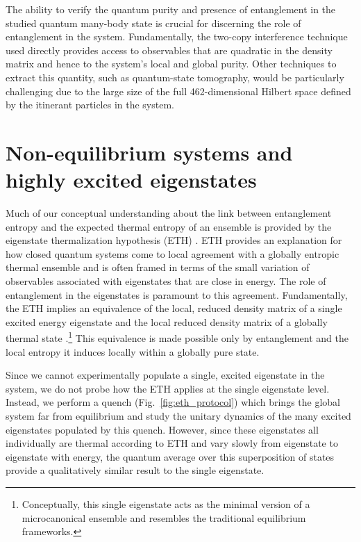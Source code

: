 The ability to verify the quantum purity and presence of entanglement in the studied quantum many-body state is crucial for discerning the role of entanglement in the system. Fundamentally, the two-copy interference technique used directly provides access to observables that are quadratic in the density matrix and hence to the system's local and global purity\cite{Islam2015}. Other techniques to extract this quantity, such as quantum-state tomography, would be particularly challenging due to the large size of the full 462-dimensional Hilbert space defined by the itinerant particles in the system. 

\section{Non-equilibrium systems and highly excited eigenstates}
\label{sec:ensPredict}

Much of our conceptual understanding about the link between entanglement entropy and the expected thermal entropy of an ensemble\cite{Santos2012,Deutsch2013} is provided by the eigenstate thermalization hypothesis (ETH) \cite{Deutsch1991,Rigol2008,Jensen1985,Srednicki1994}. ETH provides an explanation for how closed quantum systems come to local agreement with a globally entropic thermal ensemble and is often framed in terms of the small variation of observables associated with eigenstates that are close in energy\cite{Deutsch1991,Rigol2008,Srednicki1994}. The role of entanglement in the eigenstates is paramount to this agreement\cite{Deutsch2013}. Fundamentally, the ETH implies an equivalence of the local, reduced density matrix of a single excited energy eigenstate and the local reduced density matrix of a globally thermal state \cite{Nandkishore2015}.\footnote{Conceptually, this  single eigenstate acts as the minimal version of a microcanonical ensemble and resembles the traditional equilibrium frameworks.} This equivalence is made possible only by entanglement and the local entropy it induces locally within a globally pure state.  

Since we cannot experimentally populate a single, excited eigenstate in the system, we do not probe how the ETH applies at the single eigenstate level. Instead, we perform a quench (Fig.~\ref{fig:eth_protocol}) which brings the global system far from equilibrium and study the unitary dynamics of the many excited eigenstates populated by this quench. However, since these eigenstates all individually are thermal according to ETH and vary slowly from eigenstate to eigenstate with energy, the quantum average over this superposition of states provide a qualitatively similar result to the single eigenstate.

